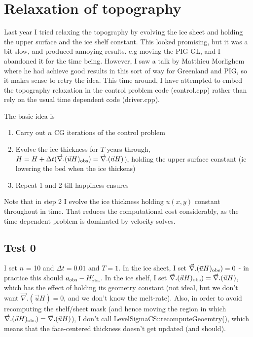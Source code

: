 \documentclass{article}
\begin{document}
\section{\label{sec::toporelax} Relaxation of topography}

Last year I tried relaxing the topography by evolving the ice sheet and holding the upper surface and the ice shelf constant. 
This looked promising, but it was a bit slow, and produced annoying results. e.g moving the PIG
GL, and I abandoned it for the time being. However, I saw a talk by Matthieu Morlighem where he had achieve
good results in this sort of way for Greenland and PIG, so it makes sense to retry the idea. This time around, 
I have attempted to embed the topography relaxation in the control problem code (control.cpp) rather than rely on the
usual time dependent code (driver.cpp).

The basic idea is
\begin{enumerate}
\item{Carry out $n$ CG iterations of the control problem}
\item{Evolve the ice thickness for $T$ years through, $H = H + \Delta t ( \vec{\nabla}. (\vec{u} H)_{\rm obs}) = \vec{\nabla}. (\vec{u} H)$),
  holding the upper surface constant (ie lowering the bed when the ice thickens) }
\item{Repeat 1 and 2 till happiness ensures}
\end{enumerate}
Note that in step 2 I evolve the ice thickness holding $u(x,y)$ constant throughout
in time. That reduces the computational cost considerably, as the time dependent problem 
is dominated by velocity solves.

\subsection{Test 0}


I set $n$ = 10 and $\Delta t = 0.01$ and $T=1$. In the ice sheet, I set 
$\vec{\nabla}. (\vec{u} H)_{\rm obs}) = 0$ - in practice this should $a_{\rm obs} - H'_{\rm obs}$.
In the ice shelf,  I set $\vec{\nabla}. (\vec{u} H)_{\rm obs}) = \vec{\nabla}. (\vec{u} H)$,
which has the effect of holding its geometry constant (not ideal, but we don't want $\vec{\nabla}. (\vec{u} H) = 0$, and we don't
know the melt-rate). Also, in order to avoid recomputing the shelf/sheet mask (and hence moving the region 
in which $\vec{\nabla}. (\vec{u} H)_{\rm obs}) = \vec{\nabla}. (\vec{u} H)$), I don't call LevelSigmaCS::recomputeGeoemtry(), 
which means that the face-centered thickness doesn't get updated (and should). 
\end{document}

